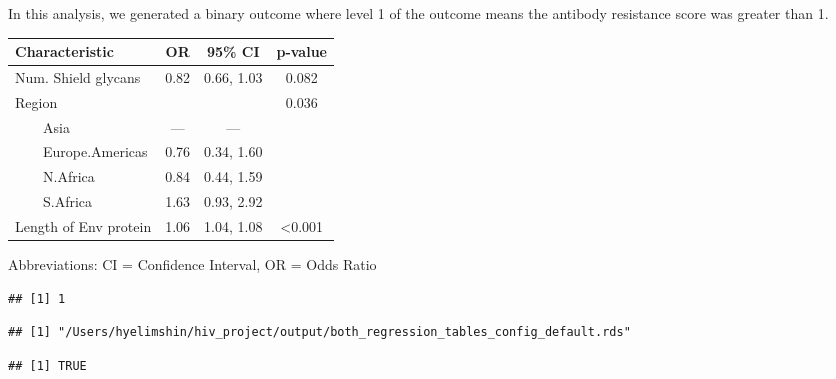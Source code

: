 \documentclass[
]{article}
\begin{document}
In this analysis, we generated a binary outcome where level 1 of the
outcome means the antibody resistance score was greater than 1.

\begin{table}[t]
\fontsize{12.0pt}{14.0pt}\selectfont
\begin{tabular*}{\linewidth}{@{\extracolsep{\fill}}lccc}
\toprule
\textbf{Characteristic} & \textbf{OR} & \textbf{95\% CI} & \textbf{p-value} \\ 
\midrule\addlinespace[2.5pt]
Num. Shield glycans & 0.82 & 0.66, 1.03 & 0.082 \\ 
Region &  &  & 0.036 \\ 
    Asia & — & — &  \\ 
    Europe.Americas & 0.76 & 0.34, 1.60 &  \\ 
    N.Africa & 0.84 & 0.44, 1.59 &  \\ 
    S.Africa & 1.63 & 0.93, 2.92 &  \\ 
Length of Env protein & 1.06 & 1.04, 1.08 & <0.001 \\ 
\bottomrule
\end{tabular*}
\begin{minipage}{\linewidth}
\vspace{.05em}
Abbreviations: CI = Confidence Interval, OR = Odds Ratio\\
\end{minipage}
\end{table}

\begin{verbatim}
## [1] 1
\end{verbatim}

\begin{verbatim}
## [1] "/Users/hyelimshin/hiv_project/output/both_regression_tables_config_default.rds"
\end{verbatim}

\begin{verbatim}
## [1] TRUE
\end{verbatim}
\end{document}
